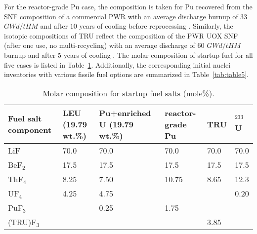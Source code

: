 For the reactor-grade Pu case, the composition is taken for Pu 
recovered from the SNF composition of a commercial \gls{PWR} with an 
average discharge burnup of $33$ $GWd/tHM$ and after $10$ years of cooling before 
reprocessing \cite{oecd1989probabilistic,marka1993explosive}. Similarly, the 
isotopic compositions of \gls{TRU} reflect the composition of the \gls{PWR} UOX SNF 
(after one use, no multi-recycling) with an average discharge of $60$ 
$GWd/tHM$ burnup and after $5$ years of cooling \cite{de2000scenarios}. 
The molar composition of startup fuel for all five cases is listed in 
Table~\ref{tab:table4}. Additionally, the corresponding initial nuclei 
inventories with various fissile fuel options are summarized in 
Table~\ref{tab:table5}.
\begin{table}  %
	\caption{Molar composition for startup fuel salts (mole\%).}
	\vspace{0.1in}
	\begin{tabularx}{\textwidth}{p{} X p{} 
	p{} X X}
		\hline
		Fuel salt component& \gls{LEU} (19.79 wt.\%) & Pu+enriched U (19.79 wt.\%) 
		&  reactor-grade Pu & \gls{TRU}& $^{233}$U \\
		\hline
		LiF&70.0&70.0&70.0&70.0&70.0\\
		BeF$_2$&17.5&17.5&17.5&17.5&17.5\\
		ThF$_4$&8.25&7.50&10.75&	8.65&12.3		\\
		UF$_4$&4.25&4.75&&&	0.20		\\
		PuF$_3$&&0.25&1.75&&		\\
		(TRU)F$_3$&&&	&3.85	&\\
		\hline
	\end{tabularx}
	\label{tab:table4}
\end{table}

